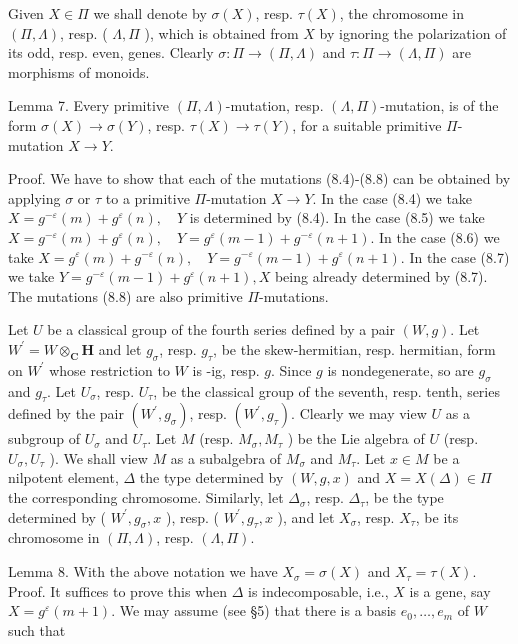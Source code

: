 \documentclass[10pt]{article}
\begin{document}
Given $X \in \Pi$ we shall denote by $\sigma(X)$, resp. $\tau(X)$, the chromosome in $(\Pi, \Lambda)$, resp. ( $\Lambda, \Pi$ ), which is obtained from $X$ by ignoring the polarization of its odd, resp. even, genes. Clearly $\sigma: \Pi \rightarrow(\Pi, \Lambda)$ and $\tau: \Pi \rightarrow(\Lambda, \Pi)$ are morphisms of monoids.

Lemma 7. Every primitive $(\Pi, \Lambda)$-mutation, resp. $(\Lambda, \Pi)$-mutation, is of the form $\sigma(X) \rightarrow \sigma(Y)$, resp. $\tau(X) \rightarrow \tau(Y)$, for a suitable primitive $\Pi$-mutation $X \rightarrow Y$.

Proof. We have to show that each of the mutations (8.4)-(8.8) can be obtained by applying $\sigma$ or $\tau$ to a primitive $\Pi$-mutation $X \rightarrow Y$. In the case (8.4) we take $X=g^{-\varepsilon}(m)+g^{\varepsilon}(n), \quad Y$ is determined by (8.4). In the case (8.5) we take $X=g^{-\varepsilon}(m)+g^{\varepsilon}(n), \quad Y=g^{\varepsilon}(m-1)+g^{-\varepsilon}(n+1)$. In the case (8.6) we take $X=g^{\varepsilon}(m)+g^{-\varepsilon}(n), \quad Y=g^{-\varepsilon}(m-1)+g^{\varepsilon}(n+1)$. In the case (8.7) we take $Y=g^{-\varepsilon}(m-1)+g^{\varepsilon}(n+1), X$ being already determined by (8.7). The mutations (8.8) are also primitive $\Pi$-mutations.

Let $U$ be a classical group of the fourth series defined by a pair $(W, g)$. Let $W^{\prime}=W \otimes_{\mathbf{C}} \mathbf{H}$ and let $g_{\sigma}$, resp. $g_{\tau}$, be the skew-hermitian, resp. hermitian, form on $W^{\prime}$ whose restriction to $W$ is -ig, resp. $g$. Since $g$ is nondegenerate, so are $g_{\sigma}$ and $g_{\tau}$. Let $U_{\sigma}$, resp. $U_{\tau}$, be the classical group of the seventh, resp. tenth, series defined by the pair $\left(W^{\prime}, g_{\sigma}\right)$, resp. $\left(W^{\prime}, g_{\tau}\right)$. Clearly we may view $U$ as a subgroup of $U_{\sigma}$ and $U_{\tau}$. Let $M$ (resp. $M_{\sigma}, M_{\tau}$ ) be the Lie algebra of $U$ (resp. $U_{\sigma}, U_{\tau}$ ). We shall view $M$ as a subalgebra of $M_{\sigma}$ and $M_{\tau}$. Let $x \in M$ be a nilpotent element, $\Delta$ the type determined by $(W, g, x)$ and $X=X(\Delta) \in \Pi$ the corresponding chromosome. Similarly, let $\Delta_{\sigma}$, resp. $\Delta_{\tau}$, be the type determined by ( $W^{\prime}, g_{\sigma}, x$ ), resp. ( $W^{\prime}, g_{\tau}, x$ ), and let $X_{\sigma}$, resp. $X_{\tau}$, be its chromosome in $(\Pi, \Lambda)$, resp. $(\Lambda, \Pi)$.

Lemma 8. With the above notation we have $X_{\sigma}=\sigma(X)$ and $X_{\tau}=\tau(X)$.\\
Proof. It suffices to prove this when $\Delta$ is indecomposable, i.e., $X$ is a gene, say $X=g^{\varepsilon}(m+1)$. We may assume (see §5) that there is a basis $e_{0}, \ldots, e_{m}$ of $W$ such that
\end{document}
